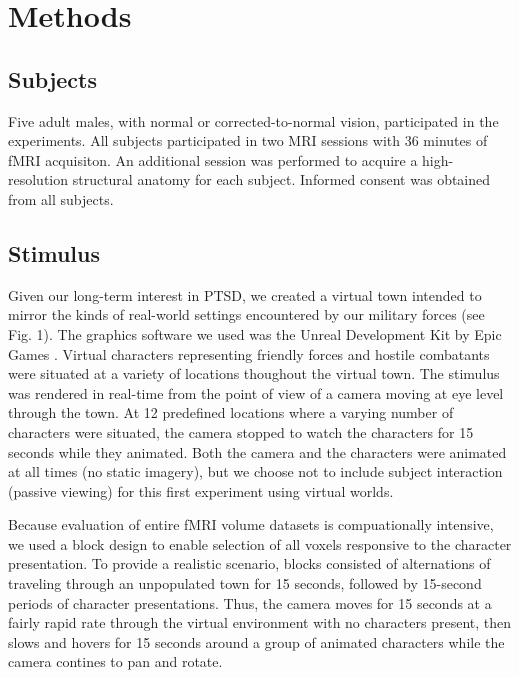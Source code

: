 \documentclass[preprint,5p,authoryear]{elsarticle}
\begin{document}
\section{Methods}

\subsection{Subjects}
Five adult males, with normal or corrected-to-normal vision, participated in the experiments. 
All subjects participated in two MRI sessions with 36 minutes of fMRI acquisiton. 
An additional session was performed to acquire a high-resolution structural anatomy for each subject. 
Informed consent was obtained from all subjects.

\subsection{Stimulus}
Given our long-term interest in PTSD, we created a virtual town intended to mirror the kinds of real-world settings encountered by our military forces (see Fig. 1).
The graphics software we used was the Unreal Development Kit by Epic Games  \citep{UnrealEngine2}.
Virtual characters representing friendly forces and hostile combatants were situated at a variety of locations thoughout the virtual town.
The stimulus was rendered in real-time from the point of view of a camera moving at eye level through the town. 
At 12 predefined locations where a varying number of characters were situated, the camera stopped to watch the characters for 15 seconds while they animated.
Both the camera and the characters were animated at all times (no static imagery), but we choose not to include subject interaction (passive viewing) for this first experiment using virtual worlds.

Because evaluation of entire fMRI volume datasets is compuationally intensive, we used a block design to enable selection of all voxels responsive to the character presentation.
To provide a realistic scenario, blocks consisted of alternations of traveling through an unpopulated town for 15 seconds, followed by 15-second periods of character presentations.
Thus, the camera moves for 15 seconds at a fairly rapid rate through the virtual environment with no characters present, then slows and hovers for 15 seconds around a group of animated characters while the camera contines to pan and rotate.
\end{document}
